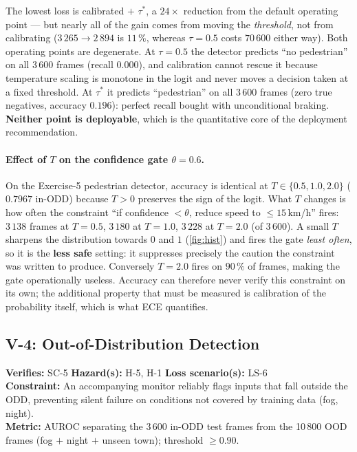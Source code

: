 \documentclass[a4paper,12pt]{article}
\begin{document}
\noindent The lowest loss is calibrated $+$ $\tau^{*}$, a $24\times$ reduction from the
default operating point --- but nearly all of the gain comes from moving the
\emph{threshold}, not from calibrating ($3\,265 \rightarrow 2\,894$ is $11\,\%$, whereas
$\tau=0.5$ costs $70\,600$ either way). Both operating points are degenerate. At
$\tau=0.5$ the detector predicts ``no pedestrian'' on all 3\,600 frames (recall $0.000$),
and calibration cannot rescue it because temperature scaling is monotone in the logit and
never moves a decision taken at a fixed threshold. At $\tau^{*}$ it predicts
``pedestrian'' on all 3\,600 frames (zero true negatives, accuracy $0.196$): perfect
recall bought with unconditional braking. \textbf{Neither point is deployable}, which is
the quantitative core of the deployment recommendation.

\paragraph{Effect of $T$ on the confidence gate $\theta=0.6$.}
On the Exercise-5 pedestrian detector, accuracy is identical at $T\in\{0.5,1.0,2.0\}$
($0.7967$ in-ODD) because $T>0$ preserves the sign of the logit. What $T$ changes is how
often the constraint ``if
confidence $<\theta$, reduce speed to $\leq15$\,km/h'' fires: $3\,138$ frames at $T=0.5$,
$3\,180$ at $T=1.0$, $3\,228$ at $T=2.0$ (of 3\,600). A small $T$ sharpens the distribution
towards $0$ and $1$ (\cref{fig:hist}) and fires the gate \emph{least often}, so it is the
\textbf{less safe} setting: it suppresses precisely the caution the constraint was written
to produce. Conversely $T=2.0$ fires on $90\,\%$ of frames, making the gate operationally
useless. Accuracy can therefore never verify this constraint on its own; the additional
property that must be measured is calibration of the probability itself, which is what ECE
quantifies.


\subsection{V-4: Out-of-Distribution Detection}

\begin{mdframed}[style=subclaim]
\textbf{Verifies:} SC-5 \quad \textbf{Hazard(s):} H-5, H-1 \quad
\textbf{Loss scenario(s):} LS-6\\
\textbf{Constraint:} An accompanying monitor reliably flags inputs that fall outside the
ODD, preventing silent failure on conditions not covered by training data (fog, night).\\
\textbf{Metric:} AUROC separating the 3\,600 in-ODD test frames from the 10\,800 OOD frames
(fog $+$ night $+$ unseen town); threshold $\geq 0.90$.
\end{mdframed}
\end{document}
